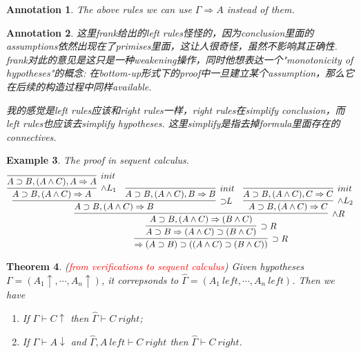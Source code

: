 \documentclass{article}
\theoremstyle{plain}
\newtheorem{theorem}{Theorem}
\newtheorem{example}[theorem]{Example}
\newtheorem{annotation}[theorem]{Annotation}
\theoremstyle{nonumberplain}
\newcommand{\redt}[1]{\textcolor{red}{#1}}
\begin{document}
\begin{annotation}
\rm The above rules we can use $\Gamma \Rightarrow A$ instead of them.
\end{annotation}

\begin{annotation}
\rm 这里frank给出的left rules怪怪的，因为conclusion里面的assumptions依然出现在了primises里面，这让人很奇怪，虽然不影响其正确性. frank对此的意见是这只是一种weakening操作，同时他想表达一个"monotonicity of hypotheses"的概念: 在bottom-up形式下的proof中一旦建立某个assumption，那么它在后续的构造过程中同样available. 

我的感觉是left rules应该和right rules一样，right rules在simplify conclusion，而left rules也应该去simplify hypotheses. 这里simplify是指去掉formula里面存在的connectives. 
\end{annotation}


\begin{example}
\rm The proof in sequent calculus.
$$
\infer[\supset R]{\Rightarrow (A \supset B) \supset ((A\wedge C) \supset (B \wedge C) ) }{\infer[\supset R]{A \supset B \Rightarrow (A\wedge C) \supset (B \wedge C)}{\infer[\wedge R]{A \supset B,(A\wedge C) \Rightarrow  (B \wedge C)}{\infer[\supset\!\! L]{A \supset B,(A\wedge C) \Rightarrow B}{\infer[\wedge L_1]{A \supset B,(A\wedge C) \Rightarrow A}{\infer[init]{A \supset B,(A\wedge C), A \Rightarrow A}{}} & \infer[init]{A \supset B,(A\wedge C),B \Rightarrow B}{} } & \infer[\wedge L_2]{A \supset B,(A\wedge C) \Rightarrow C}{\infer[init]{A \supset B,(A\wedge C),C \Rightarrow C}{}}}}}
$$
\end{example}

\begin{theorem}
\rm (\redt{from verifications to sequent calculus}) Given hypotheses $\Gamma = (A_1 \uparrow, \cdots, A_n \uparrow)$, it correpsonds to $\widehat{\Gamma} = (A_1~left,\cdots,A_n~left)$. Then we have
\begin{enumerate}
\item If $\Gamma \vdash C \uparrow$ then $\widehat{\Gamma} \vdash C~right$;
	\item If $\Gamma \vdash A \downarrow$ and $\widehat{\Gamma} , A~left \vdash C~right$ then $\widehat{\Gamma} \vdash C~right$. 
\end{enumerate}
\end{theorem}
\end{document}
